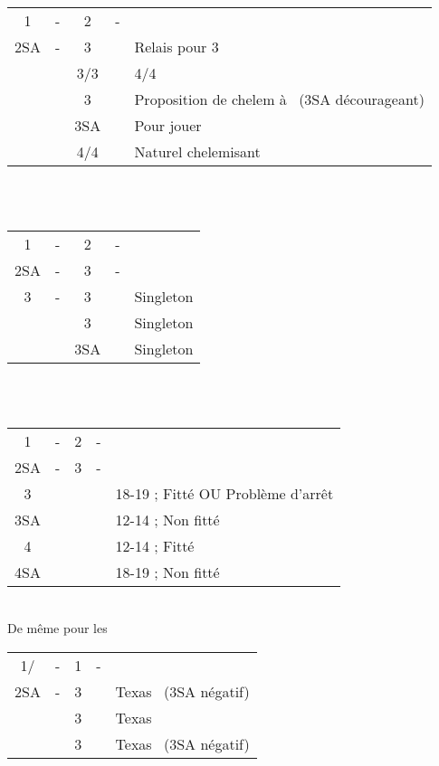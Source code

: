 \documentclass[a4paper, oneside, 11pt]{report}
\begin{document}
		\begin{tabular}{cccc|l}
		1\carreau & - & 2\trefle & - &\\
		2SA & - & 3\trefle && Relais pour 3\carreau\\
		&& 3\carreau/3\coeur && 4\coeur/4\pique\\
		&& 3\pique && Proposition de chelem à \trefle\ (3SA décourageant)\\
		&& 3SA && Pour jouer\\
		&& 4\trefle/4\carreau && Naturel chelemisant\\
		\end{tabular}\\\\

		\begin{tabular}{cccc|l}
		1\carreau & - & 2\trefle & - &\\
		2SA & - & 3\trefle & - &\\
		3\carreau & - & 3\coeur && Singleton \pique\\
		&& 3\pique && Singleton \coeur\\	
		&& 3SA && Singleton \carreau\\
		\end{tabular}\\\\

		\begin{tabular}{cccc|l}
		1\carreau & - & 2\trefle & - &\\
		2SA & - & 3\carreau & - &\\
		3\coeur &&&& 18-19 ; Fitté OU Problème d'arrêt \pique\\
		3SA &&&& 12-14 ; Non fitté\\
		4\coeur &&&& 12-14 ; Fitté\\
		4SA &&&& 18-19 ; Non fitté\\
		\end{tabular}\\
		De même pour les \pique\\

\newpage
		\begin{tabular}{cccc|l}
		1\trefle/\carreau & - & 1\coeur & - &\\
		2SA & - & 3\trefle && Texas \carreau\ (3SA négatif)\\
		&& 3\carreau && Texas \coeur\\
		&& 3\pique && Texas \trefle\ (3SA négatif)\\
		\end{tabular}\\\\
	
\end{document}
